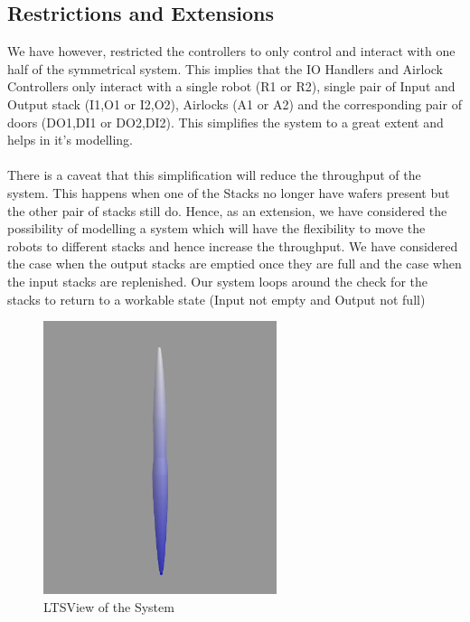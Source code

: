 \documentclass[a4paper,12pt]{article}
\begin{document}
\subsection{Restrictions and Extensions}
We have however, restricted the controllers to only control and interact with one half of the symmetrical system. This implies that the IO Handlers and Airlock Controllers only interact with a single robot (R1 or R2), single pair of Input and Output stack (I1,O1 or I2,O2), Airlocks (A1 or A2) and the corresponding pair of doors (DO1,DI1 or DO2,DI2). This simplifies the system to a great extent and helps in it's modelling.
\\
\\There is a caveat that this simplification will reduce the throughput of the system. This happens when one of the Stacks no longer have wafers present but the other pair of stacks still do. Hence, as an extension, we have considered the possibility of modelling a system which will have the flexibility to move the robots to different stacks and hence increase the throughput. 
We have considered the case when the output stacks are emptied once they are full and the case when the input stacks are replenished. Our system loops around the check for the stacks to return to a workable state (Input not empty and Output not full)
\begin{figure}[ht]
\centering
    \includegraphics[width=\textwidth, height=8cm]{3D-Model.png}
  \caption{LTSView of the System}
  \label{fig:ltsview}
\end{figure}
\newpage
\end{document}
